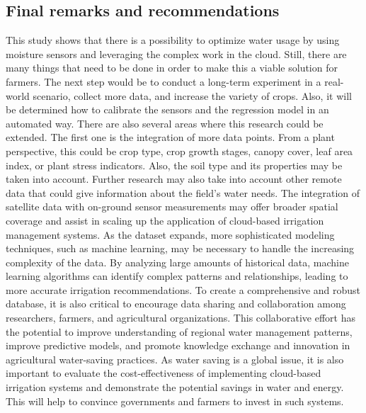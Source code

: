 \documentclass[11pt]{scrartcl} %
\begin{document}
\subsection{Final remarks and recommendations}
This study shows that there is a possibility to optimize water usage by using moisture sensors and leveraging the complex work in the cloud. Still, there are many things that need to be done in order to make this a viable solution for farmers. The next step would be to conduct a long-term experiment in a real-world scenario, collect more data, and increase the variety of crops. Also, it will be determined how to calibrate the sensors and the regression model in an automated way.
\newline There are also several areas where this research could be extended. The first one is the integration of more data points. From a plant perspective, this could be crop type, crop growth stages, canopy cover, leaf area index, or plant stress indicators. Also, the soil type and its properties may be taken into account.
\newline Further research may also take into account other remote data that could give information about the field's water needs. The integration of satellite data with on-ground sensor measurements may offer broader spatial coverage and assist in scaling up the application of cloud-based irrigation management systems.
\newline As the dataset expands, more sophisticated modeling techniques, such as machine learning, may be necessary to handle the increasing complexity of the data. By analyzing large amounts of historical data, machine learning algorithms can identify complex patterns and relationships, leading to more accurate irrigation recommendations.
\newline To create a comprehensive and robust database, it is also critical to encourage data sharing and collaboration among researchers, farmers, and agricultural organizations. This collaborative effort has the potential to improve understanding of regional water management patterns, improve predictive models, and promote knowledge exchange and innovation in agricultural water-saving practices.
\newline As water saving is a global issue, it is also important to evaluate the cost-effectiveness of implementing cloud-based irrigation systems and demonstrate the potential savings in water and energy. This will help to convince governments and farmers to invest in such systems.


\newpage
\printbibliography[title=References]
\end{document}
